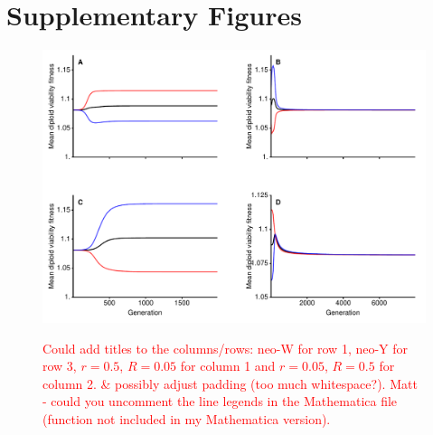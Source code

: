 \documentclass[12pt]{article}
\begin{document}
\newpage

\section*{Supplementary Figures}

\begin{figure}[!h]
\centering
\includegraphics[width=\linewidth]{Combination_MeanFit}\\
\caption{
\textcolor{red}{Could add titles to the columns/rows: neo-W for row 1, neo-Y for row 3, $r=0.5$, $R=0.05$ for column 1 and $r=0.05$, $R=0.5$ for column 2. \& possibly adjust padding (too much whitespace?). Matt - could you uncomment the line legends in the Mathematica file (function not included in my Mathematica version).}
}
\label{fig:Combination_MeanFit}
\end{figure}
\end{document}
